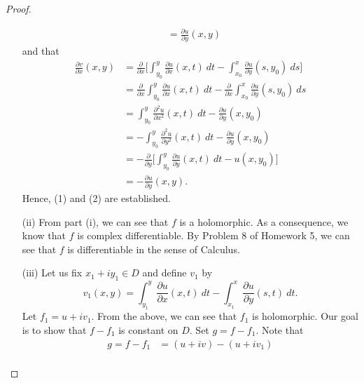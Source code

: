 \documentclass[a4paper]{article}
\begin{document}
\begin{proof}
\begin{enumerate}
\begin{align*}
                                                 &= \frac{\partial u }{\partial y } (x,y)
            \end{align*}
            and that
            \begin{align*}
                \frac{\partial v }{\partial x } (x,y) &= \frac{\partial  }{\partial x }  \Big[ \int_{ {y}_{0} }^{ y }  \frac{\partial u }{\partial x } (x,t) \ dt - \int_{ {x}_{0} }^{ x }  \frac{\partial u }{\partial y } (s,{y}_{0}) \ ds  \Big]   \\
                                                      &= \frac{\partial  }{\partial x }  \int_{ {y}_{0} }^{ y }  \frac{\partial u }{\partial x } (x,t) \ dt - \frac{\partial  }{\partial x }  \int_{ {x}_{0} }^{ x }  \frac{\partial u }{\partial y } (s, {y}_{0}) \ ds \\
                                                      &= \int_{ {y}_{0} }^{ y } \frac{\partial^{2} u }{\partial x^{2} } (x,t) \ dt - \frac{\partial u }{\partial y } (x,{y}_{0})  \\
                                                      &= - \int_{ {y}_{0} }^{ y }  \frac{\partial^{2} u }{\partial y^{2} } (x,t) \ dt - \frac{\partial u }{\partial y  }(x, {y}_{0}) \\ 
                                                      &= - \frac{\partial  }{\partial y }  \Big[ \int_{ {y}_{0} }^{ y }  \frac{\partial u }{\partial y } (x,t) \ dt - u(x,{y}_{0}) \Big] \\
                                                      &= - \frac{\partial u }{\partial y } (x,y).
            \end{align*}
Hence, (1) and (2) are established.
    \item[(ii)] From part (i), we can see that \( f  \) is a holomorphic. As a consequence, we know that \( f  \) is complex differentiable. By Problem 8 of Homework 5, we can see that \( f  \) is differentiable in the sense of Calculus.
    \item[(iii)] Let us fix \( {x}_{1} + i {y}_{1} \in D  \) and define \( {v}_{1} \) by 
        \[  {v}_{1}(x,y) = \int_{ {y}_{1} }^{ y }  \frac{\partial u }{\partial x } (x,t)  \ dt - \int_{ {x}_{1} }^{ x } \frac{\partial u }{\partial y } (s,t) \ dt. \]
        Let \( {f}_{1} = u + i {v}_{1} \). From the above, we can see that \( {f}_{1}  \) is holomorphic. Our goal is to show that \( f - {f}_{1}  \) is constant on \( D  \). Set \( g = f - {f}_{1} \). Note that 
        \begin{align*}
            g = f - {f}_{1} &= (u+iv) - (u + i {v}_{1})  \\

\end{align*}
\end{enumerate}
\end{proof}
\end{document}
